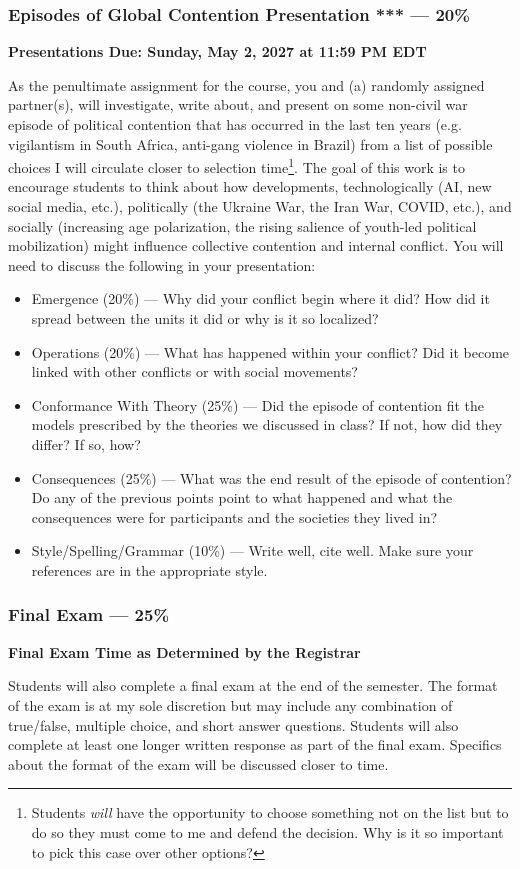 \documentclass[12pt]{article}
\begin{document}
\subsubsection*{Episodes of Global Contention Presentation \textbf{***} --- 20\%}
\textbf{Presentations Due: Sunday, May 2, 2027 at 11:59 PM EDT}
\par{As the penultimate assignment for the course, you and (a) randomly assigned partner(s), will investigate, write about, and present on some non-civil war episode of political contention that has occurred in the last ten years (e.g. vigilantism in South Africa, anti-gang violence in Brazil) from a list of possible choices I will circulate closer to selection time\footnote{Students \textit{will} have the opportunity to choose something not on the list but to do so they must come to me and defend the decision. Why is it so important to pick this case over other options?}. The goal of this work is to encourage students to think about how developments, technologically (AI, new social media, etc.), politically (the Ukraine War, the Iran War, COVID, etc.), and socially (increasing age polarization, the rising salience of youth-led political mobilization) might influence collective contention and internal conflict. You will need to discuss the following in your presentation:}
    \begin{itemize}
    \item Emergence (20\%) --- Why did your conflict begin where it did? How did it spread between the units it did or why is it so localized?
    \item Operations (20\%) --- What has happened within your conflict? Did it become linked with other conflicts or with social movements? 
    \item Conformance With Theory (25\%) --- Did the episode of contention fit the models prescribed by the theories we discussed in class? If not, how did they differ? If so, how?
    \item Consequences (25\%) --- What was the end result of the episode of contention? Do any of the previous points point to what happened and what the consequences were for participants and the societies they lived in?
    \item Style/Spelling/Grammar (10\%) --- Write well, cite well. Make sure your references are in the appropriate style.
    \end{itemize}

\subsubsection*{Final Exam --- 25\%}
\textbf{Final Exam Time as Determined by the Registrar}
\par{Students will also complete a final exam at the end of the semester. The format of the exam is at my sole discretion but may include any combination of true/false, multiple choice, and short answer questions. Students will also complete at least one longer written response as part of the final exam. Specifics about the format of the exam will be discussed closer to time.}
\end{document}
